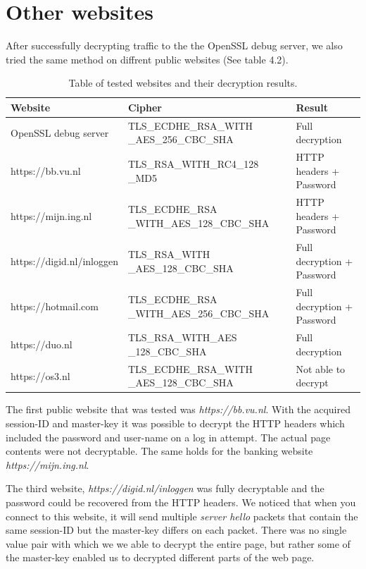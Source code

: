 \documentclass[12pt, a4paper]{report}
\begin{document}
\clearpage
\section{Other websites}

After successfully decrypting traffic to the the OpenSSL debug server, we also tried the same method on diffrent public websites (See table 4.2). 


\begin{table}[h]
\begin{tabular}{ |l|p{5cm}|p{5cm}| } 
 \hline
 Website & Cipher & Result \\ \hline 
 OpenSSL debug server & TLS\_ECDHE\_RSA\_WITH \_AES\_256\_CBC\_SHA & Full decryption \\ \hline
 
 https://bb.vu.nl & TLS\_RSA\_WITH\_RC4\_128 \_MD5 & HTTP headers + Password \\ \hline
 
 https://mijn.ing.nl & TLS\_ECDHE\_RSA \_WITH\_AES\_128\_CBC\_SHA & HTTP headers + Password \\ \hline

 https://digid.nl/inloggen & TLS\_RSA\_WITH \_AES\_128\_CBC\_SHA & Full decryption + Password \\ \hline

 https://hotmail.com & TLS\_ECDHE\_RSA \_WITH\_AES\_256\_CBC\_SHA & Full decryption + Password \\ \hline

 https://duo.nl & TLS\_RSA\_WITH\_AES \_128\_CBC\_SHA & Full decryption \\ \hline
 
 https://os3.nl & TLS\_ECDHE\_RSA\_WITH \_AES\_128\_CBC\_SHA & Not able to decrypt \\ \hline

\end{tabular}

\caption{Table of tested websites and their decryption results.}
\end{table}


The first public website that was tested was \textit{https://bb.vu.nl}. With the acquired session-ID and master-key it was possible to decrypt the HTTP headers which included the password and user-name on a log in attempt. The actual page contents were not decryptable. The same holds for the banking website \textit{ https://mijn.ing.nl}.

The third website, \textit{https://digid.nl/inloggen} was fully decryptable and the password could be recovered from the HTTP headers. We noticed that when you connect to this website, it will send multiple \textit{server hello} packets that contain the same session-ID but the master-key differs on each packet. There was no single value pair with which we we able to decrypt the entire page, but rather some of the master-key enabled us to decrypted different parts of the web page.  
\end{document}
